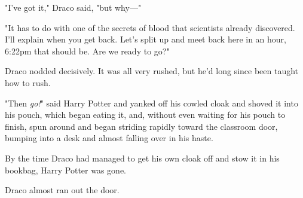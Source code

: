 "I've got it," Draco said, "but why---"

"It has to do with one of the secrets of blood that scientists already
discovered. I'll explain when you get back. Let's split up and meet back here
in an hour, 6:22pm that should be. Are we ready to go?"

Draco nodded decisively. It was all very rushed, but he'd long since been
taught how to rush.

"Then \emph{go!}" said Harry Potter and yanked off his cowled cloak and shoved
it into his pouch, which began eating it, and, without even waiting for his
pouch to finish, spun around and began striding rapidly toward the classroom
door, bumping into a desk and almost falling over in his haste.

By the time Draco had managed to get his own cloak off and stow it in his
bookbag, Harry Potter was gone.

Draco almost ran out the door.
